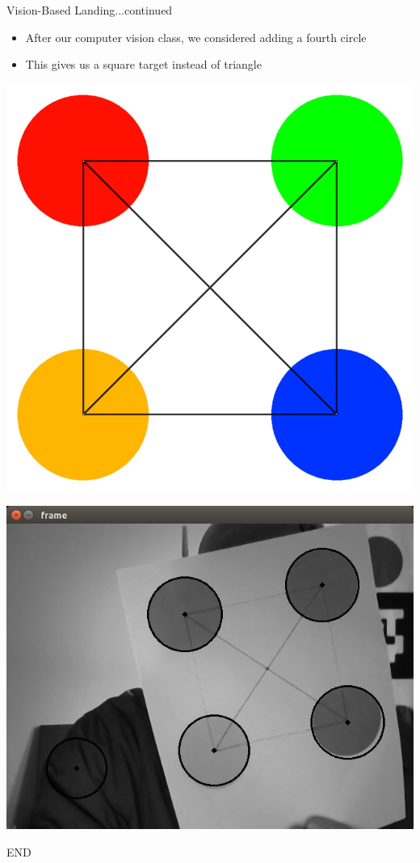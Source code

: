 \documentclass[11pt]{beamer}
\begin{document}
\begin{frame}{Vision-Based Landing...continued}
	\begin{itemize}
		\item After our computer vision class, we considered adding a fourth circle
		\item This gives us a square target instead of triangle
	\end{itemize}
\centering	\includegraphics[width=.5\textwidth]{images/landing_guide_small_x}
\end{frame}

\begin{frame}
	\includegraphics[width=1\textwidth]{images/circles}
\end{frame}

\begin{frame}{ END}
\end{frame}
\end{document}
